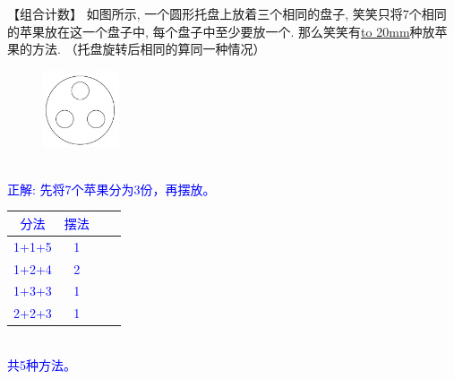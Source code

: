 \item {
    【组合计数】
    如图所示, 一个圆形托盘上放着三个相同的盘子, 笑笑只将7个相同的苹果放在这一个盘子中, 每个盘子中至少要放一个. 那么笑笑有\underline{\hbox to 20mm{}}种放苹果的方法. （托盘旋转后相同的算同一种情况）
    \begin{figure}[H] 
        \centering
        \includegraphics[width=0.2\textwidth]{./pics/Chapter_4/2015_4.png}
    \end{figure}
    \ifshowSolution 
        \fangsong{}\textcolor{blue}{
            \\正解: 先将7个苹果分为3份，再摆放。\\
            \begin{tabular}{|c|c|c|c|}
                \hline
                $分法$ & $摆法$ \\
                \hline
                1+1+5 & 1 \\
                1+2+4 & 2 \\
                1+3+3 & 1 \\
                2+2+3 & 1 \\
                \hline
            \end{tabular} \\
            共5种方法。
        }
    \else
        \vspace{1cm}
    \fi
}

